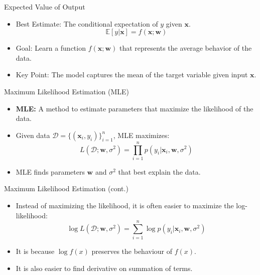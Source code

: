 \documentclass[serif, aspectratio=169]{beamer}
\begin{document}
\begin{frame}{Expected Value of Output}
    \begin{itemize}
        \item Best Estimate: The conditional expectation of \( y \) given \( \mathbf{x} \).
        \[
        \mathbb{E}[y | \mathbf{x}] = f(\mathbf{x}; \mathbf{w})
        \]
        \item Goal: Learn a function \( f(\mathbf{x}; \mathbf{w}) \) that represents the average behavior of the data.
        \item Key Point: The model captures the mean of the target variable given input \( \mathbf{x} \).
    \end{itemize}
\end{frame}

\begin{frame}{Maximum Likelihood Estimation (MLE)}
    \begin{itemize}
        \item \textbf{MLE:} A method to estimate parameters that maximize the likelihood of the data.
        \item Given data \( \mathcal{D} = \{ (\mathbf{x}_i, y_i) \}_{i=1}^n \), MLE maximizes:
        \[
        L(\mathcal{D}; \mathbf{w}, \sigma^2) = \prod_{i=1}^n p(y_i | \mathbf{x}_i, \mathbf{w}, \sigma^2)
        \]
        \item MLE finds parameters \( \mathbf{w} \) and \( \sigma^2 \) that best explain the data.
    \end{itemize}
\end{frame}

\begin{frame}{Maximum Likelihood Estimation (cont.)}
    \begin{itemize}
        \item Instead of maximizing the likelihood, it is often easier to maximize the log-likelihood:
        \[
        \log L(\mathcal{D}; \mathbf{w}, \sigma^2) = \sum_{i=1}^n \log  p(y_i | \mathbf{x}_i, \mathbf{w}, \sigma^2)
        \]
        \item It is because \( \log f(x) \) preserves the behaviour of \( f(x) \).
        \item It is also easier to find derivative on summation of terms.
    \end{itemize}
\end{frame}
\end{document}
